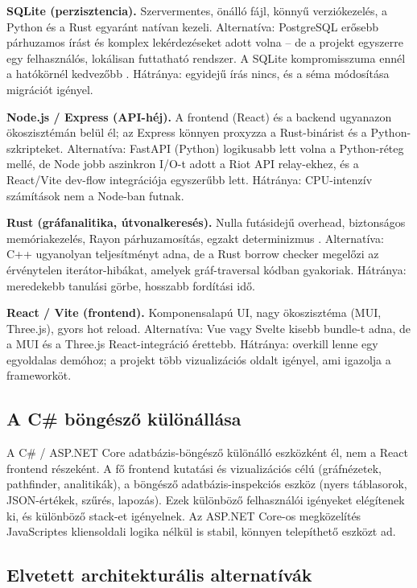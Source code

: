 \textbf{SQLite (perzisztencia).} Szervermentes, önálló fájl, könnyű verziókezelés, a Python és a Rust egyaránt natívan kezeli. Alternatíva: PostgreSQL erősebb párhuzamos írást és komplex lekérdezéseket adott volna -- de a projekt egyszerre egy felhasználós, lokálisan futtatható rendszer. A SQLite kompromisszuma ennél a hatókörnél kedvezőbb \cite{sqlite}. Hátránya: egyidejű írás nincs, és a séma módosítása migrációt igényel.

\textbf{Node.js / Express (API-héj).} A frontend (React) és a backend ugyanazon ökoszisztémán belül él; az Express könnyen proxyzza a Rust-binárist és a Python-szkripteket. Alternatíva: FastAPI (Python) logikusabb lett volna a Python-réteg mellé, de Node jobb aszinkron I/O-t adott a Riot API relay-ekhez, és a React/Vite dev-flow integrációja egyszerűbb lett. Hátránya: CPU-intenzív számítások nem a Node-ban futnak.

\textbf{Rust (gráfanalitika, útvonalkeresés).} Nulla futásidejű overhead, biztonságos memóriakezelés, Rayon párhuzamosítás, egzakt determinizmus \cite{jung2020,rustlang}. Alternatíva: C++ ugyanolyan teljesítményt adna, de a Rust borrow checker megelőzi az érvénytelen iterátor-hibákat, amelyek gráf-traversal kódban gyakoriak. Hátránya: meredekebb tanulási görbe, hosszabb fordítási idő.

\textbf{React / Vite (frontend).} Komponensalapú UI, nagy ökoszisztéma (MUI, Three.js), gyors hot reload. Alternatíva: Vue vagy Svelte kisebb bundle-t adna, de a MUI és a Three.js React-integráció érettebb. Hátránya: overkill lenne egy egyoldalas demóhoz; a projekt több vizualizációs oldalt igényel, ami igazolja a frameworköt.

\subsection{A C\# böngésző különállása}

A C\# / ASP.NET Core adatbázis-böngésző különálló eszközként él, nem a React frontend részeként. A fő frontend kutatási és vizualizációs célú (gráfnézetek, pathfinder, analitikák), a böngésző adatbázis-inspekciós eszköz (nyers táblasorok, JSON-értékek, szűrés, lapozás). Ezek különböző felhasználói igényeket elégítenek ki, és különböző stack-et igényelnek. Az ASP.NET Core-os megközelítés JavaScriptes kliensoldali logika nélkül is stabil, könnyen telepíthető eszközt ad.

\subsection{Elvetett architekturális alternatívák}

